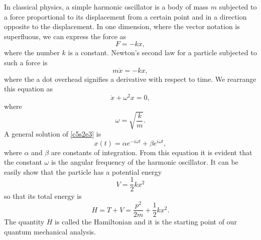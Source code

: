 In classical physics, a simple harmonic oscillator is a body of mass $m$ 
subjected to a force proportional to its displacement from a certain point and
in a direction opposite to the displacement. In one dimension, where the
vector notation is superfluous, we can express the force as
\begin{equation}\label{c5s2e1}
F = -kx,
\end{equation}
where the number $k$ is a constant. Newton's second law for a particle subjected
to such a force is
\begin{equation}\label{c5s2e2}
m\ddot{x} = -kx,
\end{equation}
where the a dot overhead signifies a derivative with respect to time. We 
rearrange this equation as
\begin{equation}\label{c5s2e3}
\ddot{x} + \omega^2 x = 0,
\end{equation}
where
\begin{equation}\label{c5s2e4}
\omega = \sqrt{\frac{k}{m}}.
\end{equation}
A general solution of \eqref{c5s2e3} is
\begin{equation}\label{c5s2e5}
x(t) = \alpha e^{-i\omega t} + \beta e^{i\omega t},
\end{equation}
where $\alpha$ and $\beta$ are constants of integration. From this equation it
is evident that the constant $\omega$ is the angular frequency of the harmonic
oscillator. It can be easily show that the particle has a potential energy
\begin{equation}\label{c5s2e6}
V = \frac{1}{2}kx^2
\end{equation}
so that its total energy is
\begin{equation}\label{c5s2e7}
H = T + V = \frac{p^2}{2m} + \frac{1}{2}kx^2.
\end{equation}
The quantity $H$ is called the Hamiltonian and it is the starting point of 
our quantum mechanical analysis.

